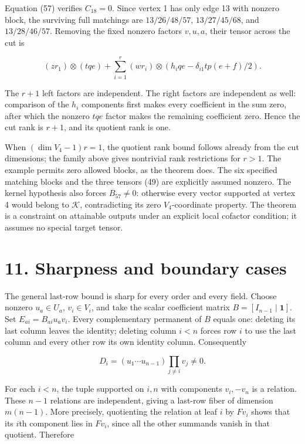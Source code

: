 \documentclass[11pt]{article}
\begin{document}
Equation (57) verifies $C_{18}=0$. Since vertex 1 has only edge 13 with nonzero block, the surviving full matchings are $13/26/48/57$, $13/27/45/68$, and $13/28/46/57$. Removing the fixed nonzero factors $v,u,a$, their tensor across the cut is


\nopagebreak[4]

\begin{equation}
(zr_1)\otimes(tqe)+
\sum_{i=1}^r(wr_i)\otimes
\left(h_iqe-\delta_{i1}tp(e+f)/2\right).
\tag{59}
\end{equation}

The $r+1$ left factors are independent. The right factors are independent as well: comparison of the $h_i$ components first makes every coefficient in the sum zero, after which the nonzero $tqe$ factor makes the remaining coefficient zero. Hence the cut rank is $r+1$, and its quotient rank is one.


When $(\dim V_4-1)r=1$, the quotient rank bound follows already from the cut dimensions; the family above gives nontrivial rank restrictions for $r>1$. The example permits zero allowed blocks, as the theorem does. The six specified matching blocks and the three tensors (49) are explicitly assumed nonzero. The kernel hypothesis also forces $B_{57}\ne0$: otherwise every vector supported at vertex 4 would belong to $\mathcal K$, contradicting its zero $V_4$-coordinate property. The theorem is a constraint on attainable outputs under an explicit local cofactor condition; it assumes no special target tensor.


\section*{11. Sharpness and boundary cases}

The general last-row bound is sharp for every order and every field. Choose nonzero $u_a\in U_a$, $v_i\in V_i$, and take the scalar coefficient matrix $B=[I_{n-1}\mid\mathbf1]$. Set $E_{ai}=B_{ai}u_av_i$. Every complementary permanent of $B$ equals one: deleting its last column leaves the identity; deleting column $i<n$ forces row $i$ to use the last column and every other row its own identity column. Consequently


\nopagebreak[4]

\begin{equation}
D_i=(u_1\cdots u_{n-1})\prod_{j\ne i}v_j\ne0.
\tag{60}
\end{equation}

For each $i<n$, the tuple supported on $i,n$ with components $v_i,-v_n$ is a relation. These $n-1$ relations are independent, giving a last-row fiber of dimension $m(n-1)$. More precisely, quotienting the relation at leaf $i$ by $Fv_i$ shows that its $i$th component lies in $Fv_i$, since all the other summands vanish in that quotient. Therefore
\end{document}
